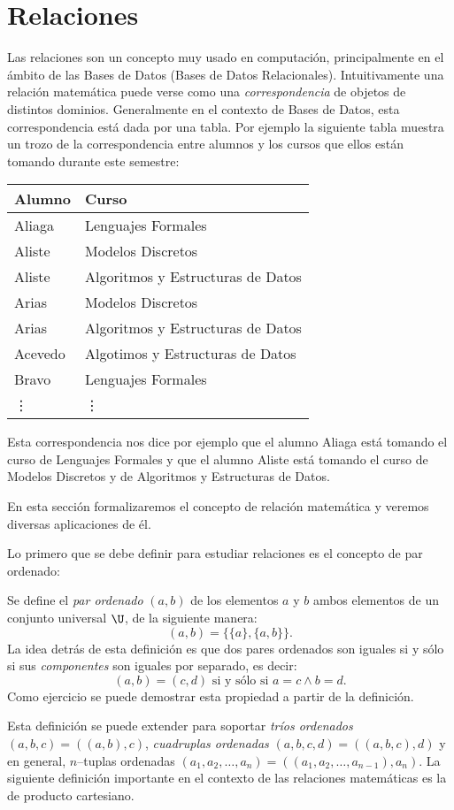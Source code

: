 \section{Relaciones}
Las relaciones son un concepto muy usado en computación, principalmente en el ámbito de las Bases de Datos (Bases de Datos Relacionales).
Intuitivamente una relación matemática puede verse como una \emph{correspondencia} de objetos de distintos dominios.
Generalmente en el contexto de Bases de Datos, esta correspondencia está dada por una tabla.
Por ejemplo la siguiente tabla muestra un trozo de la correspondencia entre alumnos y los cursos que ellos están tomando durante este semestre:
\begin{center}
\begin{tabular}{l|l}
{\bf Alumno} & {\bf Curso} \\ \hline
Aliaga & Lenguajes Formales \\
Aliste & Modelos Discretos \\
Aliste & Algoritmos y Estructuras de Datos \\
Arias &  Modelos Discretos \\
Arias &  Algoritmos y Estructuras de Datos \\
Acevedo & Algotimos y Estructuras de Datos \\
Bravo & Lenguajes Formales \\
\vdots & \vdots
\end{tabular}
\end{center}
Esta correspondencia nos dice por ejemplo que el alumno Aliaga está tomando el curso de Lenguajes Formales y que el alumno Aliste está tomando el curso de Modelos Discretos y de Algoritmos y Estructuras de Datos.

En esta sección formalizaremos el concepto de relación matemática y veremos diversas aplicaciones de él.

Lo primero que se debe definir para estudiar relaciones es el concepto de par ordenado:

\begin{definicion}
Se define el \emph{par ordenado} $(a,b)$ de los elementos $a$ y $b$ ambos elementos de un conjunto universal $\U$, de la siguiente manera:
\[
(a,b)=\{\{a\},\{a,b\}\}.
\]
La idea detrás de esta definición es que dos pares ordenados son iguales si y sólo si sus \emph{componentes} son iguales por separado, es decir:
\[
(a,b)=(c,d)\text{ si y sólo si }a=c\wedge b=d.
\]
Como ejercicio se puede demostrar esta propiedad a partir de la definición.
\end{definicion}
Esta definición se puede extender para soportar \emph{tríos ordenados} $(a,b,c)=((a,b),c)$, \emph{cuadruplas ordenadas} $(a,b,c,d)=((a,b,c),d)$ y en general, $n$--tuplas ordenadas $(a_1,a_2,\ldots,a_n)=((a_1,a_2,\ldots,a_{n-1}),a_n)$.
La siguiente definición importante en el contexto de las relaciones matemáticas es la de producto cartesiano.

